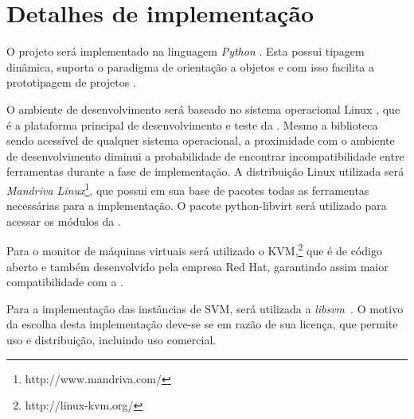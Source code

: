 \section{Detalhes de implementação}

O projeto será implementado na linguagem \emph{Python} \cite{rossum1995python}.
Esta possui tipagem dinâmica, suporta o paradigma de orientação a objetos e com
isso facilita a prototipagem de projetos \cite{lutz2006programming}.

O ambiente de desenvolvimento será baseado no sistema operacional Linux
\cite{morimoto2004entendendo}, que é a plataforma principal de
desenvolvimento e teste da \libvirt{}. Mesmo a biblioteca sendo acessível
de qualquer sistema operacional, a proximidade com o ambiente de
desenvolvimento diminui a probabilidade de encontrar incompatibilidade
entre ferramentas durante a fase de implementação. A distribuição Linux
utilizada será \emph{Mandriva Linux}\footnote{http://www.mandriva.com/},
que possui em sua base de pacotes todas as ferramentas necessárias para a
implementação. O pacote python-libvirt será utilizado para acessar
os módulos da \libvirt{}.

Para o monitor de máquinas virtuais será utilizado o
KVM,\footnote{http://linux-kvm.org/} que é de código aberto e também
desenvolvido pela empresa Red Hat, garantindo assim maior compatibilidade
com a \libvirt{}.

Para a implementação das instâncias de SVM, será utilizada a
\emph{libsvm}~\cite{chang2001libsvm}. O motivo da escolha desta
implementação deve-se se em razão de sua licença, que permite uso e
distribuição, incluindo uso comercial.
